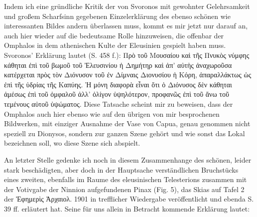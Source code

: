 \documentclass[a4paper, 11pt, oneside]{article}
\begin{document}
Indem ich eine gründliche Kritik der von Svoronos mit gewohnter Gelehrsamkeit und großem Scharfsinn gegebenen Einzelerklärung des ebenso schönen wie interessanten Bildes andern überlassen muss, kommt es mir jetzt nur darauf an, auch hier wieder auf die bedeutsame Rolle hinzuweisen, die offenbar der Omphalos in dem athenischen Kulte der Eleusinien gespielt haben muss. Svoronos' Erklärung lautet (S. 458 f.): Πρὸ τοῦ Μουσαίου καὶ τῆς Πνυκὸς νύμφης κάθηται ἐπὶ τοῦ βωμοῦ τοῦ Ἐλευσινίου ἡ Δημήτηρ καὶ ἀπ' αὐτὴς ἀναχωροῦσα κατέρχεται πρὸς τὸν Διόνυσον τοῦ ἐν Δίμναις Διονυσίου ἡ Κόρη, ἀπαραλλάκτως ὡς ἐπὶ τῆς ὑδρίας τῆς Καπύης. Ἡ μόνη διαφορὰ εἶναι ὅτι ὁ Διόνυσος δὲν κάθηται ἀμέσως ἐπὶ τοῦ ὀμφαλοῦ ἀλλ' ὀλίγον ὑψηλότερον, προφανῶς ἐπὶ τοῦ ἄνω τοῦ τεμένους αὐτοῦ ὑψώματος. Diese Tatsache scheint mir zu beweisen, dass der Omphalos auch hier ebenso wie auf den übrigen von mir besprochenen Bildwerken, mit einziger Ausnahme der Vase von Capua, genau genommen nicht speziell zu Dionysos, sondern zur ganzen Szene gehört und wie sonst das Lokal bezeichnen soll, wo diese Szene sich abspielt.

An letzter Stelle gedenke ich noch in diesem Zusammenhange des schönen, leider stark beschädigten, aber doch in der Hauptsache verständlichen Bruchstücks eines zweiten, ebenfalls im Raume des eleusinischen Telesterions zusammen mit der Votivgabe der Ninnion aufgefundenen Pinax (Fig. 5), das Skias auf Tafel 2 der Ἐφημερὶς Ἀρχαιολ. 1901 in trefflicher Wiedergabe veröffentlicht und ebenda S. 39 ff. erläutert hat. Seine für uns allein in Betracht kommende Erklärung lautet:
\end{document}
